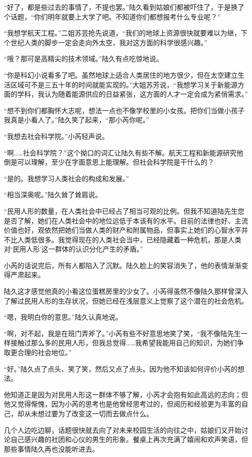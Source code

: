 “好了，都是些过去的事情了，不提也罢。”陆久看到姑娘们都被吓住了，于是换了个话题，“你们明年就要上大学了吧。不知道你们都想报考什么专业呢？”

“我想学航天工程。”二姐苏芸抢先说道，“我们的地球上资源很快就要难以为继，下个世纪人类的脚步一定会走向外太空，我对这方面的科学很感兴趣。”

“哦？那可是高精尖的技术领域。”陆久有点吃惊地说。

“你是科幻小说看多了吧。虽然地球上适合人类居住的地方很少，但在太空建立生活区域可不是三五十年的时间就能实现的。”大姐苏芳说，“我想学习关于新能源方面的学科，我认为随着能源供应的日益紧张，这方面的人才一定会成为紧俏需求。”

“想不到你们都胸怀大志呢，想法一点也不像学校里的小女孩。把你们当做小孩子我真是小看人了。”陆久笑了起来，“那小芮你呢。”

“我想去社会科学院。”小芮轻声说。

“啊……社会科学院？”这个拗口的词汇让陆久有些不解。航天工程和新能源研究他倒是可以理解，至少在字面意思上能理解。但社会科学院是干什么的？

“是的。我想学习人类社会的构成和发展。”

“相当深奥呢。”陆久耸了耸肩说。

“民用人形的数量，在人类社会中已经占了相当可观的比例。但我不知道陆先生您是否了解，她们在人类社会中的地位远低于本该有的水平。目前的法律也好、主流价值也好，观依然把她们当做人类的财产和附属物品，但事实上她们的心智水平并不比人类低很多。我觉得现在的人类社会当中，已经隐藏着一种危机，那是人类对‘民用人形’这一群体的认识分化产生的矛盾。”

小芮的话说完后，所有人都陷入了沉默。陆久脸上的笑容消失了，他的表情渐渐变得严肃起来。

陆久这才感觉他真的小看这位蛋糕房里的少女了。小芮得虽然不像陆久那样曾深入了解过民用人形的生存状况，但她已经在浅层意义上觉察了这个潜在的社会危机。

“嗯，我明白你的意思。”陆久认真地说。

“啊，对不起，我是在班门弄斧了。”小芮有些不好意思地笑了笑，“我不像陆先生一样接触过那么多的民用人形，但我总觉得……我希望我能用自己的知识，为她们争取更合理的社会地位。”

“好。”陆久点了点头、笑了笑，然后又点了点头。因为他不知该如何评价小芮的想法。

他知道正是因为对民用人形这一群体不够了解，小芮才会抱有如此高远的志向；但他又觉得惭愧，因为小芮的思考也是他曾经思考过的，但阅历和经验更为丰富的自己，却从未想过要为了改变这一切而去做点什么。

几个人边吃边聊，话题很快就去向了对未来校园生活的向往之中，姑娘们又开始讨论自己感兴趣的社团和心仪的男生的形象。餐桌上再次充满了嬉闹和欢声笑语，但那些事情陆久再也没能听进去。

